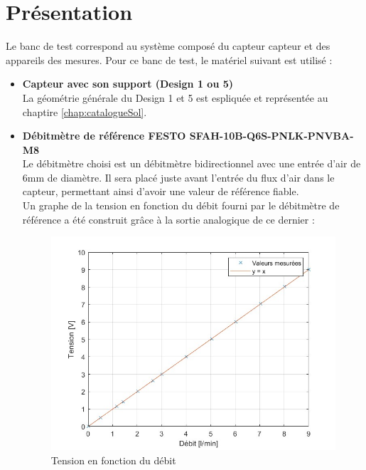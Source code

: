 
\section{Présentation}
Le banc de test correspond au système composé du capteur \gls{capteur} et des appareils des mesures. Pour ce banc de test, le matériel suivant est utilisé :
\begin{itemize}
    \item \textbf{Capteur avec son support (Design 1 ou 5)}\\
          La géométrie générale du Design 1 et 5 est espliquée et représentée au chaptire \ref*{chap:catalogueSol}. \\

    \item \textbf{Débitmètre de référence FESTO SFAH-10B-Q6S-PNLK-PNVBA-M8}\\
          Le débitmètre choisi est un débitmètre bidirectionnel avec une entrée d'air de 6mm de diamètre. Il sera placé juste avant l'entrée du flux
          d'air dans le capteur, permettant ainsi d'avoir une valeur de référence fiable.\\

          Un graphe de la tension en fonction du débit fourni par le débitmètre de référence a été construit grâce à la sortie analogique de ce dernier :
          \begin{figure}[H]
              \centering
              \includegraphics[scale = 0.4]{assets/figures/Calibration_maison.jpg}
              \caption{Tension en fonction du débit}
              \label{fig:calibration}
          \end{figure}


\end{itemize}
